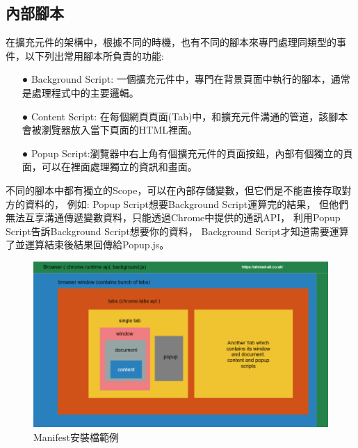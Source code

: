 \subsection{內部腳本}\label{s2.6.3}
在擴充元件的架構中，根據不同的時機，也有不同的腳本來專門處理同類型的事件，以下列出常用腳本所負責的功能:
\begin{itemize}
    \item[●] Background Script: 一個擴充元件中，專門在背景頁面中執行的腳本，通常是處理程式中的主要邏輯。
    \item[●] Content Script: 在每個網頁頁面(Tab)中，和擴充元件溝通的管道，該腳本會被瀏覽器放入當下頁面的HTML裡面。
    \item[●] Popup Script:瀏覽器中右上角有個擴充元件的頁面按鈕，內部有個獨立的頁面，可以在裡面處理獨立的資訊和畫面。
\end{itemize}
不同的腳本中都有獨立的Scope，可以在內部存儲變數，但它們是不能直接存取對方的資料的，
例如:
Popup Script想要Background Script運算完的結果，
但他們無法互享溝通傳遞變數資料，只能透過Chrome中提供的通訊API，
利用Popup Script告訴Background Script想要你的資料，
Background Script才知道需要運算了並運算結束後結果回傳給Popup.js。

\indent
\begin{figure}[H]
    \centering
    \includegraphics[width=1\textwidth]{picture/ch2-extension-script.png}
    \caption{Manifest安裝檔範例}
    \label{f2.5}
\end{figure}